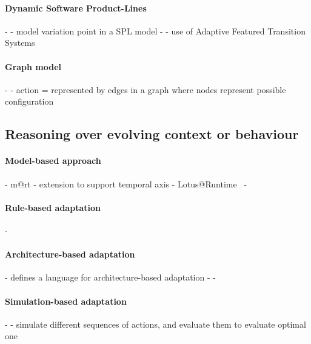 \paragraph{Dynamic Software Product-Lines}
- \cite{DBLP:conf/dagstuhl/GhezziS10}
	- model variation point in a SPL model
- \cite{DBLP:series/lncs/CordyCHLS13}
	- use of Adaptive Featured Transition Systems
	
\paragraph{Graph model}
- \cite{DBLP:journals/computer/GeorgasHT09}
	- action = represented by edges in a graph where nodes represent possible configuration
	 
	 
	 
	 
	 
\subsection{Reasoning over evolving context or behaviour}

\paragraph{Model-based approach}
- \gls{m@rt} \cite{DBLP:journals/computer/BlairBF09, DBLP:journals/computer/MorinBJFS09}
	- extension to support temporal axis \cite{DBLP:conf/seke/0001FNMKT14, DBLP:conf/models/0001FNMKBT14}
- Lotus@Runtime~\cite{DBLP:conf/icse/BarbosaLMJ17}
- \cite{DBLP:conf/icse/ChenPYNZ14}
		
\paragraph{Rule-based adaptation}
- \cite{DBLP:conf/icse/ArcainiRS15, DBLP:conf/icse/TaharaOH17, DBLP:conf/eurosys/GraceHPBCT08}

\paragraph{Architecture-based adaptation}
- \cite{DBLP:journals/jss/ChengG12} defines a language for architecture-based adaptation
- \cite{DBLP:journals/computer/GarlanCHSS04}
- \cite{DBLP:journals/computer/GeorgasHT09}

\paragraph{Simulation-based adaptation}
- \cite{DBLP:conf/smartgridsec/0001FKNT14}
	- simulate different sequences of actions, and evaluate them to evaluate optimal one


